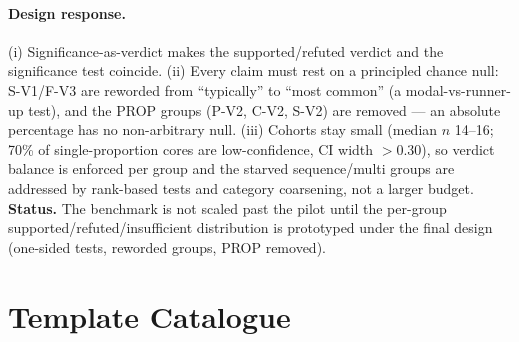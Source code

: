 \documentclass[11pt]{article}
\begin{document}
\paragraph{Design response.} (i) Significance-as-verdict makes the
supported/refuted verdict and the significance test coincide. (ii) Every claim must rest
on a principled chance null: S-V1/F-V3 are reworded from ``typically'' to ``most common''
(a modal-vs-runner-up test), and the PROP groups (P-V2, C-V2, S-V2) are removed --- an
absolute percentage has no non-arbitrary null. (iii) Cohorts stay small (median $n$
14--16; 70\% of single-proportion cores are low-confidence, CI width $>0.30$), so verdict
balance is enforced per group and the starved sequence/multi groups are addressed by
rank-based tests and category coarsening, not a larger budget.
\noindent\textbf{Status.} The benchmark is not scaled past the pilot
until the per-group supported/refuted/insufficient distribution is prototyped under the
final design (one-sided tests, reworded groups, PROP removed).
\section{Template Catalogue}
\end{document}
